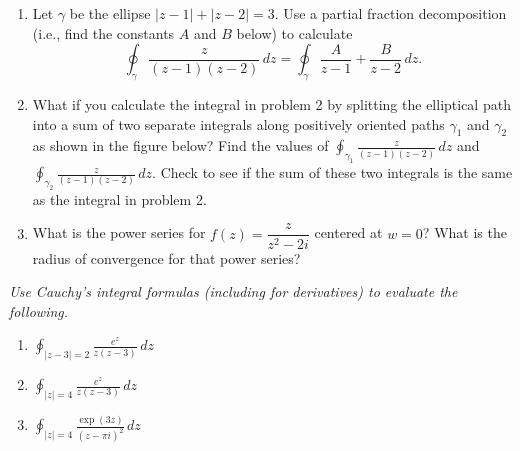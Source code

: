 \documentclass[11pt]{article}
\newcommand{\ds}{\displaystyle}
\begin{document}
\begin{enumerate}
\item Let $\gamma$ be the ellipse $|z-1|+|z-2| = 3$.  Use a partial fraction decomposition (i.e., find the constants $A$ and $B$ below) to calculate
$$\oint_\gamma \frac{z}{(z-1)(z-2)} \, dz = \oint_\gamma  \frac{A}{z-1} + \frac{B}{z-2} \, dz.$$
\begin{flushright}
\end{flushright}


\item What if you calculate the integral in problem 2 by splitting the elliptical path into a sum of two separate integrals along positively oriented paths $\gamma_1$ and $\gamma_2$ as shown in the figure below?  Find the values of $\ds \oint_{\gamma_1} \frac{z}{(z-1)(z-2)} \, dz$ and $\ds \oint_{\gamma_2} \frac{z}{(z-1)(z-2)} \, dz$.  Check to see if the sum of these two integrals is the same as the integral in problem 2. 
\begin{flushright}
\end{flushright}


\item What is the power series for $f(z) = \dfrac{z}{z^2 - 2i}$ centered at $w = 0$?  What is the radius of convergence for that power series?  
\vfill

\setcounter{enumCount}{\theenumi}
\end{enumerate}

\newpage

\noindent 
\textit{Use Cauchy's integral formulas (including for derivatives) to evaluate the following.}
\begin{multicols}{3}
\begin{enumerate}
\setcounter{enumi}{\theenumCount}
\item $\ds \oint_{|z-3|=2} \frac{e^z}{z(z-3)} \, dz$
\item $\ds \oint_{|z| = 4} \frac{e^z}{z(z-3)} \, dz$
\item $\ds \oint_{|z| = 4} \frac{\exp(3z)}{(z-\pi i)^2} \, dz$
\setcounter{enumCount}{\theenumi}
\end{enumerate}
\end{multicols}
\vfill
\vfill 
\end{document}
